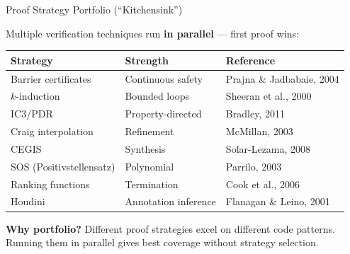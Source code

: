 \documentclass[aspectratio=169]{beamer}
\begin{document}
\begin{frame}{Proof Strategy Portfolio (``Kitchensink'')}

Multiple verification techniques run \textbf{in parallel} --- first proof wins:

\vspace{0.5em}
\begin{tabular}{lll}
\textbf{Strategy} & \textbf{Strength} & \textbf{Reference} \\
\hline
Barrier certificates & Continuous safety & Prajna \& Jadbabaie, 2004 \\
$k$-induction & Bounded loops & Sheeran et al., 2000 \\
IC3/PDR & Property-directed & Bradley, 2011 \\
Craig interpolation & Refinement & McMillan, 2003 \\
CEGIS & Synthesis & Solar-Lezama, 2008 \\
SOS (Positivstellensatz) & Polynomial & Parrilo, 2003 \\
Ranking functions & Termination & Cook et al., 2006 \\
Houdini & Annotation inference & Flanagan \& Leino, 2001 \\
\end{tabular}

\vspace{0.5em}
\textbf{Why portfolio?} Different proof strategies excel on different code patterns.\\
Running them in parallel gives best coverage without strategy selection.

\end{frame}
\end{document}
